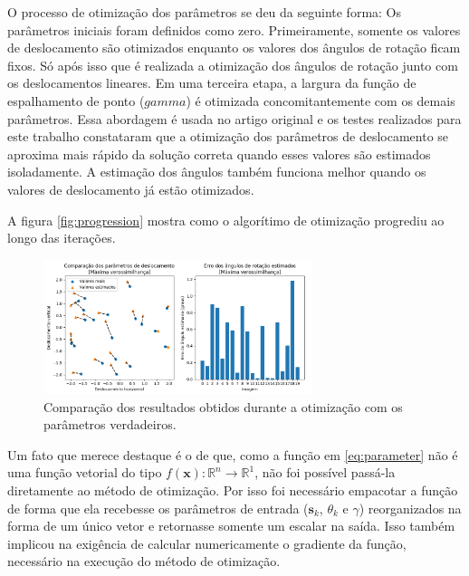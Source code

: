 
O processo de otimização dos parâmetros se deu da seguinte forma:
Os parâmetros iniciais foram definidos como zero.
Primeiramente, somente os valores de deslocamento são otimizados enquanto os valores dos ângulos de rotação ficam fixos.
Só após isso que é realizada a otimização dos ângulos de rotação junto com os deslocamentos lineares.
Em uma terceira etapa, a largura da função de espalhamento de ponto ($gamma$) é otimizada
concomitantemente com os demais parâmetros.
Essa abordagem é usada no artigo original e os testes realizados para este trabalho
constataram que a otimização dos parâmetros de deslocamento se aproxima mais rápido da
solução correta quando esses valores são estimados isoladamente.
A estimação dos ângulos também funciona melhor quando os valores de deslocamento já estão
otimizados.

A figura \ref{fig:progression} mostra como o algorítimo de otimização progrediu ao longo das iterações.

\begin{figure}[h]
	\centering
	\includegraphics[width=0.7\textwidth]{./figures/results_figures/comparisson_plot.png}
	\caption{Comparação dos resultados obtidos durante a otimização com os parâmetros verdadeiros.}
	\label{fig:comparisson}
\end{figure}

Um fato que merece destaque é o de que, como a função em \ref{eq:parameter} não é uma
função vetorial do tipo $ f(\mathbf{x}) : \mathbb{R}^n \to \mathbb{R}^1 $, não foi 
possível passá-la diretamente ao método de otimização.
Por isso foi necessário empacotar a função de forma que ela recebesse os parâmetros de
entrada ($\mathbf{s}_k$, $\theta_k$ e $\gamma$) reorganizados na forma de um único
vetor e retornasse somente um escalar na saída.
Isso também implicou na exigência de calcular numericamente o gradiente da função,
necessário na execução do método de otimização.

